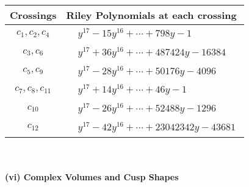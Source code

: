 \documentclass[1p]{elsarticle_modified}
\theoremstyle{definition}
\begin{document}
\begin{tabular}{m{50pt}|m{274pt}}
Crossings & \hspace{64pt}Riley Polynomials at each crossing \\
\hline $$\begin{aligned}c_{1},c_{2},c_{4}\end{aligned}$$&$\begin{aligned}
&y^{17}-15 y^{16}+\cdots+798 y-1
\end{aligned}$\\
\hline $$\begin{aligned}c_{3},c_{6}\end{aligned}$$&$\begin{aligned}
&y^{17}+36 y^{16}+\cdots+487424 y-16384
\end{aligned}$\\
\hline $$\begin{aligned}c_{5},c_{9}\end{aligned}$$&$\begin{aligned}
&y^{17}-28 y^{16}+\cdots+50176 y-4096
\end{aligned}$\\
\hline $$\begin{aligned}c_{7},c_{8},c_{11}\end{aligned}$$&$\begin{aligned}
&y^{17}+14 y^{16}+\cdots+46 y-1
\end{aligned}$\\
\hline $$\begin{aligned}c_{10}\end{aligned}$$&$\begin{aligned}
&y^{17}-26 y^{16}+\cdots+52488 y-1296
\end{aligned}$\\
\hline $$\begin{aligned}c_{12}\end{aligned}$$&$\begin{aligned}
&y^{17}-42 y^{16}+\cdots+23042342 y-43681
\end{aligned}$\\
\hline
\end{tabular}\\~\\
\newpage\flushleft \textbf{(vi) Complex Volumes and Cusp Shapes}
\end{document}
